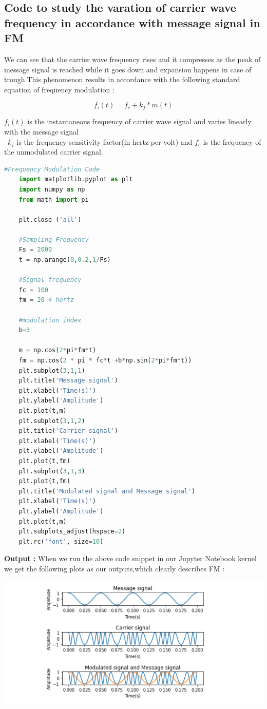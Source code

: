 \documentclass[12pt,a4paper]{article}%
\begin{document}
   \subsection{Code to study the varation of carrier wave frequency in accordance with message signal in FM}
   \begin{flushleft}We can see that the carrier wave frequency rises and it compresses as the peak of message signal is reached while it goes down and expansion happens in case of trough.This phenomenon results in accordance with the following standard equation of frequency modulation :
   	\begin{center}
   		\[f_{i}(t)=f_{c} + k_{f}*m(t) \]
   	\end{center}
     $f_i(t)$ is the instantaneous frequency of carrier wave signal and varies linearly with the message signal \\\ $k_f$ is the frequency-sensitivity factor(in hertz per volt) and $f_c$ is the frequency of the unmodulated carrier signal.
   	\lstset{numbers=none,breaklines=true,} 
   	\begin{lstlisting}[language=python]
   	#Frequency Modulation Code
   	import matplotlib.pyplot as plt
   	import numpy as np
   	from math import pi
   	
   	plt.close ('all')
   	
   	#Sampling Frequency
   	Fs = 2000
   	t = np.arange(0,0.2,1/Fs)
   	
   	#Signal frequency
   	fc = 100
   	fm = 20 # hertz
   	
   	#modulation index
   	b=3
   	
   	m = np.cos(2*pi*fm*t)
   	fm = np.cos(2 * pi * fc*t +b*np.sin(2*pi*fm*t))
   	plt.subplot(3,1,1)
   	plt.title('Message signal')
   	plt.xlabel('Time(s)')
   	plt.ylabel('Amplitude')
   	plt.plot(t,m)
   	plt.subplot(3,1,2)
   	plt.title('Carrier signal')
   	plt.xlabel('Time(s)')
   	plt.ylabel('Amplitude')
   	plt.plot(t,fm)
   	plt.subplot(3,1,3)
   	plt.plot(t,fm)
   	plt.title('Modulated signal and Message signal')
   	plt.xlabel('Time(s)')
   	plt.ylabel('Amplitude')
   	plt.plot(t,m)
   	plt.subplots_adjust(hspace=2)
   	plt.rc('font', size=10)
   	  \end{lstlisting}
   	\large\textbf{Output : }
   	\small When we run the above code snippet in our Jupyter Notebook kernel we get the following plots as our outputs,which clearly describes FM :
   	\begin{center}
   		{\includegraphics[width=0.80 \textwidth]{./images/FM.PNG}}\\\bigskip
   	\end{center}
   \end{flushleft}
   \pagebreak
\end{document}

